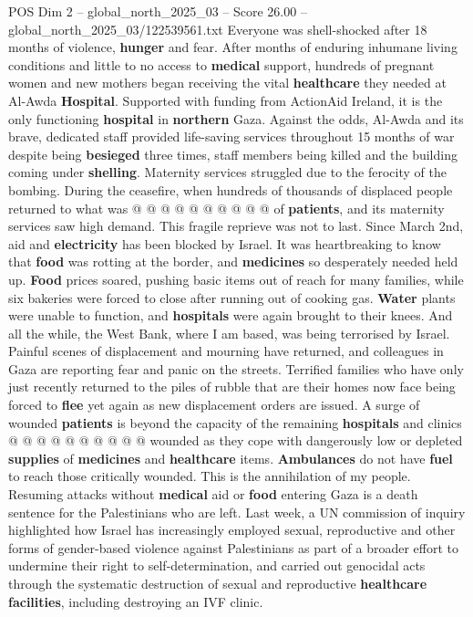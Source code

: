\begin{textsample}{POS Dim 2 – global\_north\_2025\_03 – Score 26.00 – global\_north\_2025\_03/122539561.txt}
Everyone was shell-shocked after 18 months of violence, \textbf{hunger} and fear.
After months of enduring inhumane living conditions and little to no access to \textbf{medical} support, hundreds of pregnant women and new mothers began receiving the vital \textbf{healthcare} they needed at Al-Awda \textbf{Hospital}.
Supported with funding from ActionAid Ireland, it is the only functioning \textbf{hospital} in \textbf{northern} Gaza.
Against the odds, Al-Awda and its brave, dedicated staff provided life-saving services throughout 15 months of war despite being \textbf{besieged} three times, staff members being killed and the building coming under \textbf{shelling}.
Maternity services struggled due to the ferocity of the bombing.
During the ceasefire, when hundreds of thousands of displaced people returned to what was @ @ @ @ @ @ @ @ @ @ of \textbf{patients}, and its maternity services saw high demand.
This fragile reprieve was not to last.
Since March 2nd, aid and \textbf{electricity} has been blocked by Israel.
It was heartbreaking to know that \textbf{food} was rotting at the border, and \textbf{medicines} so desperately needed held up. \textbf{Food} prices soared, pushing basic items out of reach for many families, while six bakeries were forced to close after running out of cooking gas. \textbf{Water} plants were unable to function, and \textbf{hospitals} were again brought to their knees.
And all the while, the West Bank, where I am based, was being terrorised by Israel.
Painful scenes of displacement and mourning have returned, and colleagues in Gaza are reporting fear and panic on the streets.
Terrified families who have only just recently returned to the piles of rubble that are their homes now face being forced to \textbf{flee} yet again as new displacement orders are issued.
A surge of wounded \textbf{patients} is beyond the capacity of the remaining \textbf{hospitals} and clinics @ @ @ @ @ @ @ @ @ @ wounded as they cope with dangerously low or depleted \textbf{supplies} of \textbf{medicines} and \textbf{healthcare} items. \textbf{Ambulances} do not have \textbf{fuel} to reach those critically wounded.
This is the annihilation of my people.
Resuming attacks without \textbf{medical} aid or \textbf{food} entering Gaza is a death sentence for the Palestinians who are left.
Last week, a UN commission of inquiry highlighted how Israel has increasingly employed sexual, reproductive and other forms of gender-based violence against Palestinians as part of a broader effort to undermine their right to self-determination, and carried out genocidal acts through the systematic destruction of sexual and reproductive \textbf{healthcare} \textbf{facilities}, including destroying an IVF clinic.

\end{textsample}
